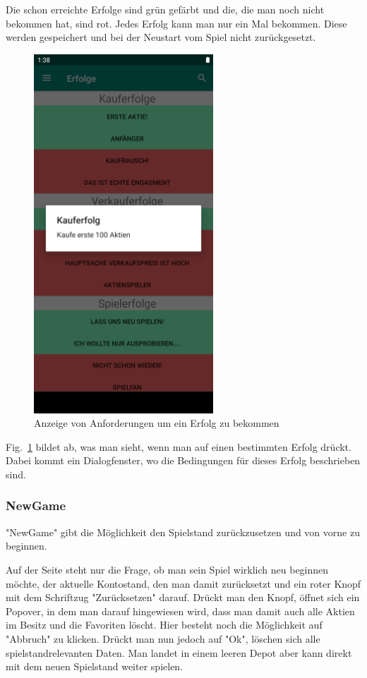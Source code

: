 \documentclass[10pt]{scrartcl}
\begin{document}
Die schon erreichte Erfolge sind grün gefärbt und die, die man noch nicht bekommen hat, sind rot. Jedes Erfolg kann man nur ein Mal bekommen. Diese werden gespeichert und bei der Neustart vom Spiel nicht zurückgesetzt.

\begin{figure}[H]
	\centering
	\includegraphics[width=0.6\textwidth]{Bilder/Applikation/erfolgeDetalien.png}
	\caption{Anzeige von Anforderungen um ein Erfolg zu bekommen}
	\label{erfolge2}
\end{figure}

Fig.~\ref{erfolge2} bildet ab, was man sieht, wenn man auf einen bestimmten Erfolg drückt. Dabei kommt ein Dialogfenster, wo die Bedingungen für dieses Erfolg beschrieben sind.

\subsubsection{NewGame}

"NewGame" gibt die Möglichkeit den Spielstand zurückzusetzen und von vorne zu beginnen. 

Auf der Seite steht nur die Frage, ob man sein Spiel wirklich neu beginnen möchte, der aktuelle Kontostand, den man damit zurücksetzt und ein roter Knopf mit dem Schriftzug "Zurücksetzen" darauf. Drückt man den Knopf, öffnet sich ein Popover, in dem man darauf hingewiesen wird, dass man damit auch alle Aktien im Besitz und die Favoriten löscht. Hier besteht noch die Möglichkeit auf "Abbruch" zu klicken. Drückt man nun jedoch auf "Ok", löschen sich alle spielstandrelevanten Daten. Man landet in einem leeren Depot aber kann direkt mit dem neuen Spielstand weiter spielen.
\end{document}
